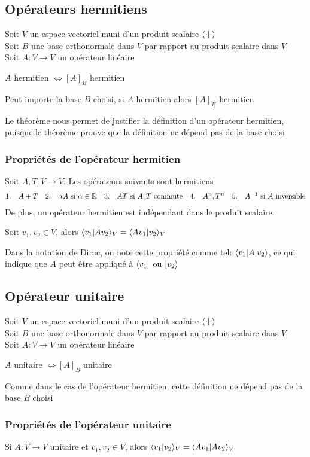 \subsection{Opérateurs hermitiens}
Soit $V$ un espace vectoriel muni d'un produit scalaire $\langle \cdot \lvert \cdot \rangle$ \\
Soit $B$ une base orthonormale dans $V$ par rapport au produit scalaire dans $V$ \\
Soit $A\colon V \to V$ un opérateur linéaire
\begin{definition}
    $A$ hermitien $\iff [A]_B$ hermitien 
\end{definition}
\begin{theorem}
    Peut importe la base $B$ choisi, si $A$ hermitien alors $[A]_B$ hermitien
\end{theorem}
\begin{remark}
    Le théorème nous permet de justifier la définition d'un opérateur hermitien, puisque 
    le théorème prouve que la définition ne dépend pas de la base choisi
\end{remark}

\subsubsection{Propriétés de l'opérateur hermitien}
Soit $A, T\colon V \to V$. Les opérateurs suivants sont hermitiens
\begin{align*}
    1. \quad A + T& &2. \quad \alpha A \ \text{si} \ \alpha \in \R& &3. \quad AT \ \text{si} \ A,T \ \text{commute}& &4. \quad A^n, T^n& &5. \quad A^{-1} \ \text{si} \ A \ \text{inversible} 
\end{align*}
De plus, un opérateur hermitien est indépendant dans le produit scalaire. 
\begin{lemma}
    Soit $v_1, v_2 \in V$, alors $\langle v_1 \lvert Av_2 \rangle_V = \langle Av_1 \lvert v_2 \rangle_V$
\end{lemma}
\noindent
Dans la notation de Dirac, on note cette propriété comme tel: $\langle v_1\rvert A\lvert v_2\rangle$,
ce qui indique que $A$ peut être appliqué à $\langle v_1\rvert$ ou $\lvert v_2\rangle$

\subsection{Opérateur unitaire}
Soit $V$ un espace vectoriel muni d'un produit scalaire $\langle \cdot \lvert \cdot \rangle$ \\
Soit $B$ une base orthonormale dans $V$ par rapport au produit scalaire dans $V$ \\
Soit $A\colon V \to V$ un opérateur linéaire
\begin{definition}
    $A$ unitaire $\iff [A]_B$ unitaire 
\end{definition}
\begin{remark}
    Comme dans le cas de l'opérateur hermitien, cette définition ne dépend pas de la base $B$ choisi
\end{remark}

\subsubsection{Propriétés de l'opérateur unitaire}
\begin{lemma}
    Si $A\colon V \to V$ unitaire et $v_1, v_2 \in V$, alors $\langle v_1 \lvert v_2 \rangle_V = \langle Av_1 \lvert Av_2 \rangle_V $
\end{lemma}